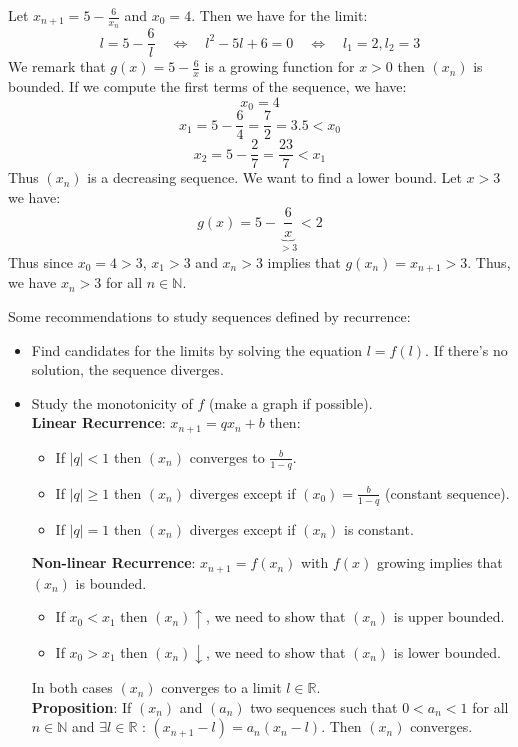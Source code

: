 \begin{eg}
    Let $x_{n + 1} = 5 - \frac{6}{x_n}$ and $x_0 = 4$. Then we have for the limit:
    \[
        l = 5 - \frac{6}{l} \quad \Leftrightarrow \quad l^2 - 5l + 6 = 0 \quad \Leftrightarrow \quad l_1 = 2, l_2 = 3
    \]
    We remark that $g(x) = 5 - \frac{6}{x}$ is a growing function for $x > 0$ then $(x_n)$ is bounded. If we compute the first terms of the sequence, we have:
    \[ x_0 = 4 \]
    \[ x_1 = 5 - \frac{6}{4} = \frac{7}{2} = 3.5 < x_0 \]
    \[ x_2 = 5 - \frac{2}{7} = \frac{23}{7} < x_1 \]
    Thus $(x_n)$ is a decreasing sequence. We want to find a lower bound. Let $x > 3$ we have:
    \[ g(x) = 5 - \underbrace{\frac{6}{x}}_{> 3} < 2 \]
    Thus since $x_0 = 4 > 3$, $x_1 > 3$ and $x_n > 3$ implies that $g(x_n) = x_{n + 1} > 3$. Thus, we have $x_n > 3$ for all $n \in \mathbb{N}$. 
\end{eg}
Some recommendations to study sequences defined by recurrence:
\begin{itemize}[itemsep=1pt,label=$\circ$]
    \item Find candidates for the limits by solving the equation $l = f(l)$. If there's no solution, the sequence diverges.
    \item Study the monotonicity of $f$ (make a graph if possible). \\
    \textbf{Linear Recurrence}: $x_{n + 1} = qx_n + b$ then:
    \begin{itemize}[itemsep=1pt]
        \item If $|q| < 1$ then $(x_n)$ converges to $\frac{b}{1 - q}$.
        \item If $|q| \geq 1$ then $(x_n)$ diverges except if $(x_0) = \frac{b}{1 - q}$ (constant sequence).
        \item If $|q| = 1$ then $(x_n)$ diverges except if $(x_n)$ is constant.
    \end{itemize}
    \textbf{Non-linear Recurrence}: $x_{n + 1} = f(x_n)$ with $f(x)$ growing implies that $(x_n)$ is bounded.
    \begin{itemize}
        \item If $x_0 < x_1$ then $(x_n) \uparrow$, we need to show that $(x_n)$ is upper bounded.
        \item If $x_0 > x_1$ then $(x_n) \downarrow$, we need to show that $(x_n)$ is lower bounded.
    \end{itemize}
    In both cases $(x_n)$ converges to a limit $l \in \mathbb{R}$. \\
    \textbf{Proposition}: If $(x_n)$ and $(a_n)$ two sequences such that $0 < a_n < 1$ for all $n \in \mathbb{N}$ and $\exists l \in \mathbb{R}$ : $(x_{n + 1} - l) = a_n (x_n - l)$. Then $(x_n)$ converges.
\end{itemize}